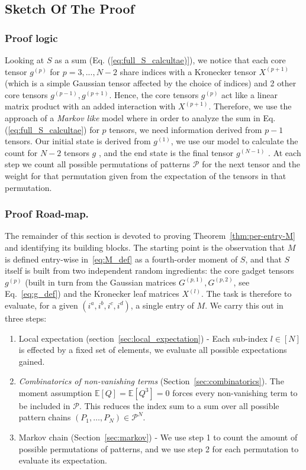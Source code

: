 \documentclass[12pt,a4paper]{article}
\begin{document}
\subsection{Sketch Of The Proof}
\subsubsection{Proof logic}
Looking at $S$  as a sum (Eq. (\ref{eq:full_S_calcultae)}), we notice that each core tensor $g^{(p)}$ for $p=3,...,N-2$ share indices with a Kronecker tensor $X^{(p+1)}$  (which is a simple Gaussian tensor affected by the choice of indices) and 2 other core tensors $g^{(p-1)},g^{(p+1)}$.
Hence, the core tensors $g^{(p)}$  act like a linear matrix product with an added interaction with $X^{(p+1)}$.
Therefore, we use the approach of  a \emph{Markov like} model where in order to analyze the sum in Eq. (\ref{eq:full_S_calcultae}) for $p$ tensors, we need information derived from $p-1$  tensors.
Our initial state is derived from $g^{(1)}$, we use our model to calculate the count for $N-2$  tensors $g$ , and the end state is the final tensor $g^{(N-1)}$ .
At each step we count all possible permutations of patterns $\mathcal{P}$  for the next tensor and the weight for that permutation given from the expectation of the tensors in that permutation.

\subsubsection{Proof Road-map.}
The remainder of this section is devoted to proving Theorem~\ref{thm:per-entry-M} and identifying its building blocks. The starting point is the observation that $M$ is defined entry-wise in~\eqref{eq:M_def} as a fourth-order moment of $S$, and that $S$ itself is built from two independent random ingredients: the core gadget tensors $g^{(p)}$ (built in turn from the Gaussian matrices $G^{(p,1)}, G^{(p,2)}$, see Eq.~\eqref{eq:g_def}) and the Kronecker leaf matrices $X^{(l)}$.   
The task is therefore to evaluate, for a given $(i^a, i^b, i^c, i^d)$, a single entry of $M$. We carry this out in three steps:
\begin{enumerate}
    \item Local expectation  (section~\ref{sec:local_expectation}) -  Each sub-index $l\in [N]$ is effected by a fixed set of elements, we evaluate all possible expectations gained.
    \item \emph{Combinatorics of non-vanishing terms} (Section~\ref{sec:combinatorics}). The moment assumption $\mathbb{E}[Q] = \mathbb{E}[Q^3] = 0$ forces every non-vanishing term to be included  in $\mathcal{P}$. This reduces the index sum to a sum over all possible pattern chains $(P_1, \dots, P_N) \in \mathcal{P}^N$.
    \item Markov chain  (Section~\ref{sec:markov}) - We use step 1 to count the amount of possible permutations of patterns, and we use step 2 for each permutation to evaluate its expectation.
\end{enumerate}
\end{document}
